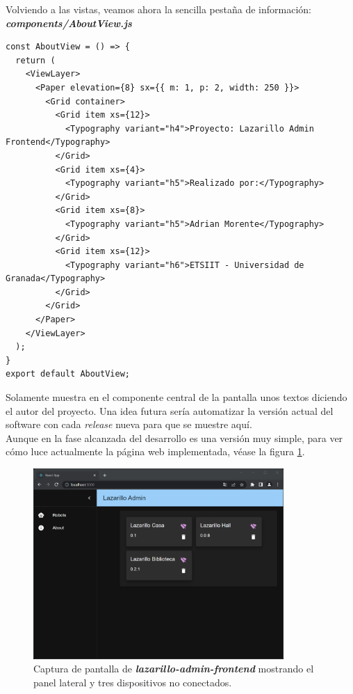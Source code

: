 Volviendo a las vistas, veamos ahora la sencilla pestaña de información:\\

\textbf{\textit{components/AboutView.js}}
\begin{lstlisting}
const AboutView = () => {
  return (
    <ViewLayer>
      <Paper elevation={8} sx={{ m: 1, p: 2, width: 250 }}>
        <Grid container>
          <Grid item xs={12}>
            <Typography variant="h4">Proyecto: Lazarillo Admin Frontend</Typography>
          </Grid>
          <Grid item xs={4}>
            <Typography variant="h5">Realizado por:</Typography>
          </Grid>
          <Grid item xs={8}>
            <Typography variant="h5">Adrian Morente</Typography>
          </Grid>
          <Grid item xs={12}>
            <Typography variant="h6">ETSIIT - Universidad de Granada</Typography>
          </Grid>
        </Grid>
      </Paper>
    </ViewLayer>
  );
}
export default AboutView;
\end{lstlisting}

Solamente muestra en el componente central de la pantalla unos textos diciendo el autor del proyecto. Una idea futura sería automatizar la versión actual del software con cada \textit{release} nueva para que se muestre aquí.\\

Aunque en la fase alcanzada del desarrollo es una versión muy simple, para ver cómo luce actualmente la página web implementada, véase la figura \ref{lazarillo-admin-frontend}.\\

\begin{figure}[h]
	\centering
	\includegraphics[width=0.85\textwidth]{imagenes/lazarillo-admin-frontend.png}
	\caption{Captura de pantalla de \textit{\textbf{lazarillo-admin-frontend}} mostrando el panel lateral y tres dispositivos no conectados.}
	\label{lazarillo-admin-frontend}
\end{figure}






